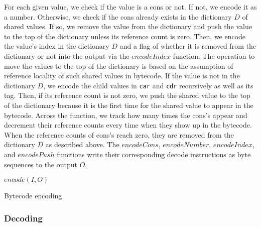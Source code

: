 \documentclass[sigplan]{acmart}
\begin{document}
For each given value, we check if the value is a cons or not.
If not, we encode it as a number.
Otherwise, we check if the cons already exists in the dictionary $D$ of
shared values.
If so, we remove the value from the dictionary and push the value to
the top of the dictionary unless its reference count is zero.
Then, we encode the value's index in the dictionary $D$ and a flag of whether it
is removed from the dictionary or not into the output via the
$encodeIndex$ function.
The operation to move the values to the top of the dictionary is based on the
assumption of reference locality of such shared values in bytecode.
If the value is not in the dictionary $D$, we encode the child values in
\texttt{car} and \texttt{cdr} recursively as well as its tag.
Then, if its reference count is not zero, we push the shared value to
the top of the dictionary because it is the first time for the shared value
to appear in the bytecode.
Across the function, we track how many times the cons's appear and
decrement their reference counts every time when they show up in the bytecode.
When the reference counts of cons's reach zero, they are removed from the
dictionary $D$ as described above.
The $encodeCons$, $encodeNumber$, $encodeIndex$, and $encodePush$
functions write their corresponding decode instructions as byte
sequences to the output $O$.

\begin{algorithm}


  $encode(I, O)$ \;

  \caption{Bytecode encoding}
  \label{algorithm:encode}
\end{algorithm}

\subsubsection{Decoding} \label{decoding}
\end{document}
